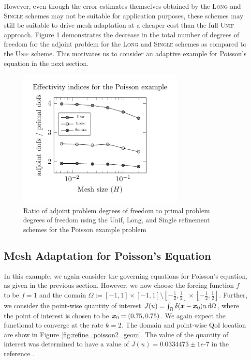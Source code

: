 However, even though the error estimates themselves obtained by
the \textsc{Long} and \textsc{Single} schemes may not be suitable
for application purposes, these schemes may still be suitable to
drive mesh adaptation at a cheaper cost than the full \textsc{Unif}
approach. Figure \ref{fig:refine_poisson_dofs}
demonstrates the decrease in the total number of degrees of
freedom for the adjoint problem for the \textsc{Long} and \textsc{Single}
schemes as compared to the \textsc{Unif} scheme. This motivates
us to consider an adaptive example for Poisson's equation in the
next section.

%
\begin{figure}[ht!]
\centering
\includegraphics[width=0.75\textwidth]{img/refine_poisson_dofs}
\caption{Ratio of adjoint problem degrees of freedom to primal
problem degrees of freedom using the Unif,
Long, and Single refinement schemes
for the Poisson example problem}
\label{fig:refine_poisson_dofs}
\end{figure}

\subsection{Mesh Adaptation for Poisson's Equation}

In this example, we again consider the governing equations for Poisson's
equation, as given in the previous section. However, we now choose the
forcing function $f$ to be $f=1$ and the domain
$\Omega := [-1,1] \times [-1,1] \setminus
[-\frac12, \frac12] \times [-\frac12, \frac12]$. Further, we consider
the point-wise quantity of interest
$J(u) = \int_{\Omega} \delta(\boldsymbol{x} - \boldsymbol{x}_0) u \, \text{d} \Omega$,
where the point of interest is chosen to be
$\boldsymbol{x}_0 = (0.75, 0.75)$. We again expect the functional to converge
at the rate $k = 2$. The domain and point-wise QoI location are show
in Figure \ref{fig:refine_poisson2_geom}. The value of the quantity
of interest was determined to have a value of $J(u) = 0.0334473
\pm 1e\mbox{-}7$ in the reference \cite{dealiistep14}.

